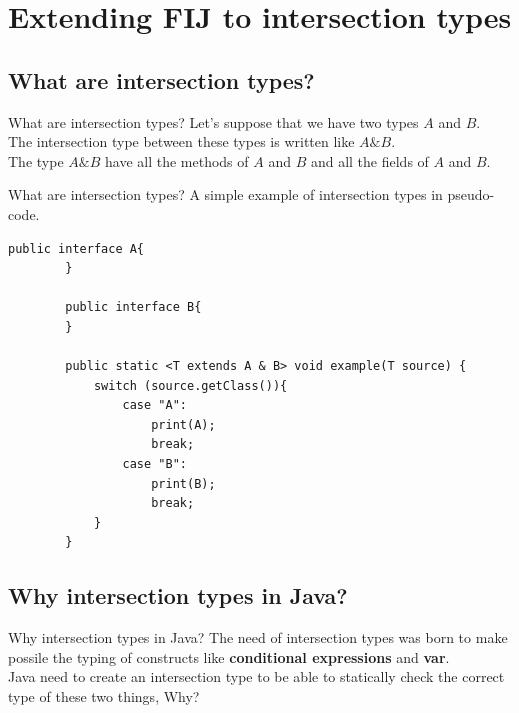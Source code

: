 \documentclass{beamer}
\begin{document}
    \section{Extending FIJ to intersection types}
    
    \subsection{What are intersection types?}
   
    \begin{frame}{What are intersection types?}
    \boldmath
    Let's suppose that we have two types $A$ and $B$.\\
    The intersection type between these types is written like $A\&B$.\\
    The type $A\&B$ have all the methods of $A$ and $B$ and all the fields of $A$ and $B$.
    
	\end{frame}

	\begin{frame}[fragile]{What are intersection types?}
	\boldmath
	A simple example of intersection types in pseudo-code.
	\begin{flushleft}
		\begin{lstlisting}[basicstyle=\scriptsize]
		public interface A{
		}
		
		public interface B{
		}
		
		public static <T extends A & B> void example(T source) {
			switch (source.getClass()){
				case "A":
					print(A);
					break;
				case "B":
					print(B);
					break;
			}
		}
		\end{lstlisting}
	\end{flushleft}
	\end{frame}

	\subsection{Why intersection types in Java?}
	\begin{frame}{Why intersection types in Java?}
	The need of intersection types was born to make possile the typing of constructs like \textbf{conditional expressions} and \textbf{var}.\\
	Java need to create an intersection type to be able to statically check the correct type of these two things, Why?
	\end{frame}
\end{document}
